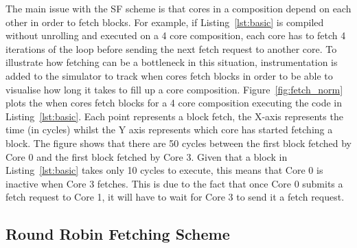 The main issue with the SF scheme is that cores in a composition depend on each other in order to fetch blocks.
For example, if Listing~\ref{lst:basic} is compiled without unrolling and executed on a 4 core composition, each core has to fetch 4 iterations of the loop before sending the next fetch request to another core.
To illustrate how fetching can be a bottleneck in this situation, instrumentation is added to the simulator to track when cores fetch blocks in order to be able to visualise how long it takes to fill up a core composition.
Figure~\ref{fig:fetch_norm} plots the when cores fetch blocks for a 4 core composition executing the code in Listing~\ref{lst:basic}.
Each point represents a block fetch, the X-axis represents the time (in cycles) whilst the Y axis represents which core has started fetching a block.
The figure shows that there are 50 cycles between the first block fetched by Core 0 and the first block fetched by Core 3.
Given that a block in Listing~\ref{lst:basic} takes only 10 cycles to execute, this means that Core 0 is inactive when Core 3 fetches.
This is due to the fact that once Core 0 submits a fetch request to Core 1, it will have to wait for Core 3 to send it a fetch request.


\subsection{Round Robin Fetching Scheme}


